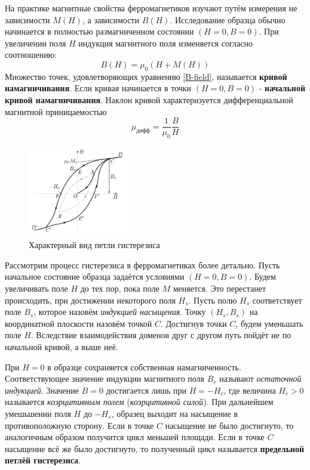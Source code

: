 \documentclass[14pt, a4paper,reqno]{article}
\begin{document}
    На практике магнитные свойства ферромагнетиков изучают путём измерения не зависимости $M(H)$, а зависимости
    $B(H)$. Исследование образца обычно начинается в полностью размагниченном состоянии $(H = 0, B = 0)$. При
    увеличении поля $H$ индукция магнитного поля изменяется согласно соотношению:
    \begin{equation}\label{B-field}
        B(H) = \mu_0(H + M(H))
    \end{equation}
    Множество точек, удовлетворяющих уравнению \eqref{B-field}, называется \textbf{кривой намагничивания}. 
    Если кривая начинается в точки $(H = 0, B = 0)$ - \textbf{начальной кривой намагничивания}. Наклон кривой 
    характеризуется дифференциальной магнитной приницаемостью 
    \begin{equation*}
        \mu_{дифф} = \frac{1}{\mu_0}\frac{B}{H}
    \end{equation*}

    \begin{figure}
        \begin{center}
            \includegraphics[width = 0.4\textwidth]{images/picture_1.png}
        \end{center}
    \caption{Характерный вид петли гистерезиса}
    \end{figure}

    Рассмотрим процесс гистерезиса в ферромагнетиках более детально. Пусть начальное состояние образца задаётся условиями
    $(H = 0, B = 0)$. Будем увеличивать поле $H$ до тех пор, пока поле $M$ меняется. Это перестанет происходить, при достижении
    некоторого поля $H_s$. Пусть полю $H_s$ соответствует поле $B_s$, которое назовём \textit{индукцией насыщения}. Точку
    $(H_s, B_s)$ на координатной плоскости назовём точкой $C$. Достигнув точки $C$, будем уменьшать поле $H$. Вследствие
    взаимодействия доменов друг с другом путь пойдёт не по начальной кривой, а выше неё.
    
    При $H = 0$ в образце сохраняется собственная намагниченность. Соответствующее значение индукции магнитного поля $B_r$
    называют \textit{остаточной индукцией}. Значение $B = 0$ достигается лишь при $H = -H_c$, где величина $H_c > 0$ называется
    \textit{коэрцитивным полем} (\textit{коэрцитивной силой}). При дальнейшем умешьшении поля $H$ до $-H_s$, образец выходит
    на насыщение в противоположную сторону. Если в точке $C$ насыщение не было достигнуто, то аналогичным образом получится 
    цикл меньшей площади. Если в точке $C$ насыщение всё же было достигнуто, то полученный цикл называется \textbf{предельной
    петлёй гистерезиса}.
\end{document}
